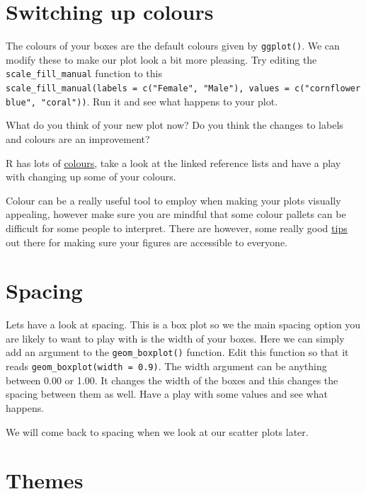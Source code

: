 \documentclass[
]{book}
\begin{document}
\hypertarget{colours}{%
\section{Switching up colours}\label{colours}}

The colours of your boxes are the default colours given by \texttt{ggplot()}. We can modify these to make our plot look a bit more pleasing. Try editing the \texttt{scale\_fill\_manual} function to this \texttt{scale\_fill\_manual(labels\ =\ c("Female",\ "Male"),\ values\ =\ c("cornflowerblue",\ "coral"))}. Run it and see what happens to your plot.

What do you think of your new plot now? Do you think the changes to labels and colours are an improvement?

R has lots of \href{https://www.datanovia.com/en/blog/awesome-list-of-657-r-color-names/}{colours}, take a look at the linked reference lists and have a play with changing up some of your colours.

Colour can be a really useful tool to employ when making your plots visually appealing, however make sure you are mindful that some colour pallets can be difficult for some people to interpret. There are however, some really good \href{https://www.tableau.com/en-gb/about/blog/examining-data-viz-rules-dont-use-red-green-together\#:~:text=Use\%20a\%20colour\%2Dblind\%2Dfriendly\%20palette\%20when\%20appropriate\&text=For\%20example\%2C\%20blue\%2Forange\%20is,blue\%20to\%20someone\%20with\%20CVD}{tips} out there for making sure your figures are accessible to everyone.

\hypertarget{spacing}{%
\section{Spacing}\label{spacing}}

Lets have a look at spacing. This is a box plot so we the main spacing option you are likely to want to play with is the width of your boxes. Here we can simply add an argument to the \texttt{geom\_boxplot()} function. Edit this function so that it reads \texttt{geom\_boxplot(width\ =\ 0.9)}. The width argument can be anything between 0.00 or 1.00. It changes the width of the boxes and this changes the spacing between them as well. Have a play with some values and see what happens.

We will come back to spacing when we look at our scatter plots later.

\hypertarget{themes}{%
\section{Themes}\label{themes}}
\end{document}
